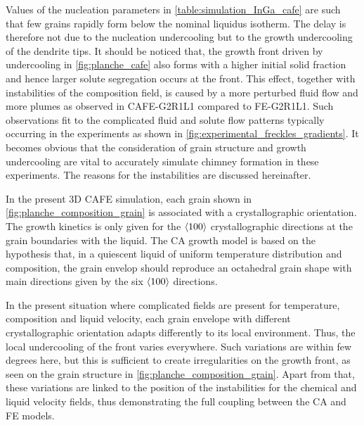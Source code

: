 Values of the nucleation parameters in \cref{table:simulation_InGa_cafe} are such 
that few grains rapidly form below the nominal liquidus isotherm. The delay is therefore not due to the nucleation 
undercooling but to the growth undercooling of the dendrite tips. It should be noticed that, the growth front driven 
by undercooling in \cref{fig:planche_cafe} also forms with a higher initial solid fraction and hence larger solute segregation occurs 
at the front. This effect, together with instabilities of the composition field, is caused by a more perturbed fluid flow 
and more plumes as observed in CAFE-G2R1L1 compared to FE-G2R1L1. 
Such observations fit to the complicated fluid and solute 
flow patterns typically occurring in the experiments as shown in \cref{fig:experimental_freckles_gradients}. 
It becomes obvious that the consideration of grain 
structure and growth undercooling are vital to accurately simulate chimney formation in these experiments. The reasons for the 
instabilities are discussed hereinafter. 

In the present 3D CAFE simulation, each grain shown in \cref{fig:planche_composition_grain} 
is associated with a crystallographic orientation. 
The growth kinetics is only given for the $\langle 100 \rangle$ crystallographic 
directions at the grain boundaries with the liquid. The CA growth model 
is based on the hypothesis that, in a quiescent liquid of uniform temperature distribution and composition, the grain envelop should 
reproduce an octahedral grain shape with main directions given by the six $\langle 100 \rangle$ directions. 

In the present situation where complicated 
fields are present for temperature, composition and liquid velocity, each grain envelope with different crystallographic orientation 
adapts differently to its local environment. Thus, the local undercooling of the front varies everywhere. Such variations are within 
few degrees here, but this is sufficient to create irregularities on the growth front, as seen on the grain structure in \cref{fig:planche_composition_grain}. 
Apart from that, these variations are linked to the position of the instabilities for the chemical and liquid velocity fields, thus 
demonstrating the full coupling between the CA and FE models.


